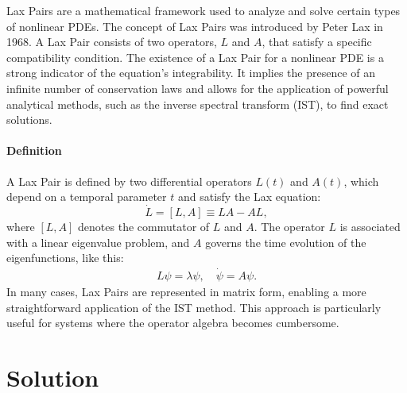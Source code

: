 \documentclass[english,master]{liumaiex}
\theoremstyle{plain}
\theoremstyle{definition}
\begin{document}
Lax Pairs are a mathematical framework used to analyze and solve certain types of nonlinear PDEs. The concept of Lax Pairs was introduced by Peter Lax in 1968. A Lax Pair consists of two operators, $L$ and $A$, that satisfy a specific compatibility condition.
The existence of a Lax Pair for a nonlinear PDE is a strong indicator of the equation's integrability. It implies the presence of an infinite number of conservation laws and allows for the application of powerful analytical methods, such as the inverse spectral transform (IST), to find exact solutions.

\subsubsection{Definition}

A Lax Pair is defined by two differential operators $L(t)$ and $A(t)$, which depend on a temporal parameter $t$ and satisfy the Lax equation:
\begin{equation}
    \dot{L} = [L,A] \equiv LA - AL,
\end{equation}
where $[L, A]$ denotes the commutator of $L$ and $A$. The operator $L$ is associated with a linear eigenvalue problem, and $A$ governs the time evolution of the eigenfunctions, like this:
\begin{align}
    L\psi = \lambda\psi, \quad \dot{\psi} = A\psi.
\end{align}
%
In many cases, Lax Pairs are represented in matrix form, enabling a more straightforward application of the IST method. This approach is particularly useful for systems where the operator algebra becomes cumbersome.

\chapter{Solution}
\end{document}
